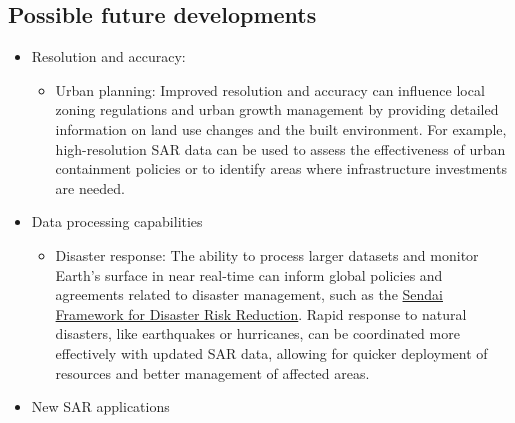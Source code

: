 \documentclass[
  letterpaper,
  DIV=11,
  numbers=noendperiod]{scrreprt}
\providecommand{\tightlist}{%
  \setlength{\itemsep}{0pt}\setlength{\parskip}{0pt}}\usepackage{longtable,booktabs,array}
\begin{document}
\hypertarget{possible-future-developments}{%
\subsection{Possible future
developments}\label{possible-future-developments}}

\begin{itemize}
\tightlist
\item
  Resolution and accuracy:

  \begin{itemize}
  \tightlist
  \item
    Urban planning: Improved resolution and accuracy can influence local
    zoning regulations and urban growth management by providing detailed
    information on land use changes and the built environment. For
    example, high-resolution SAR data can be used to assess the
    effectiveness of urban containment policies or to identify areas
    where infrastructure investments are needed.
  \end{itemize}
\item
  Data processing capabilities

  \begin{itemize}
  \tightlist
  \item
    Disaster response: The ability to process larger datasets and
    monitor Earth's surface in near real-time can inform global policies
    and agreements related to disaster management, such as the
    \href{https://www.undrr.org/implementing-sendai-framework/what-sendai-framework}{Sendai
    Framework for Disaster Risk Reduction}. Rapid response to natural
    disasters, like earthquakes or hurricanes, can be coordinated more
    effectively with updated SAR data, allowing for quicker deployment
    of resources and better management of affected areas.
  \end{itemize}
\item
  New SAR applications


\end{itemize}
\end{document}

